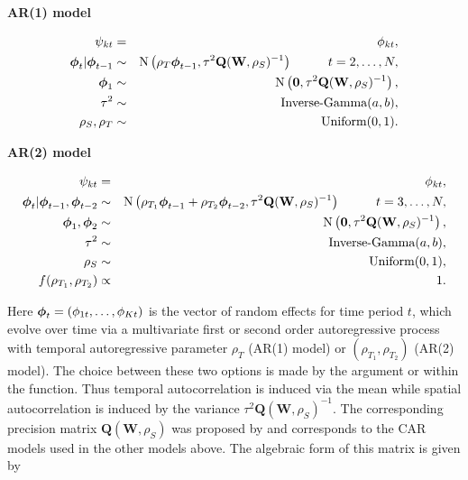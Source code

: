 \documentclass[article, nojss]{jss}
\newcommand{\bd}[1]{\ensuremath{\mbox{\boldmath $#1$}}}
\begin{document}
\textbf{AR(1) model}


\begin{eqnarray}
\psi_{kt}&=&\phi_{kt},\label{carar}\\
\bd{\phi}_t|\bd{\phi}_{t-1} & \sim & \mbox{N}\left(\rho_T\bd{\phi}_{t-1}, \tau^{2} \mathbf{Q}(\mathbf{W},\rho_S)^{-1}\right)\hspace{1cm} t=2,\ldots,N,\nonumber\\
\bd{\phi}_1 & \sim & \mbox{N}\left(\mathbf{0}, \tau^{2} \mathbf{Q}(\mathbf{W},\rho_S)^{-1}\right),\nonumber\\
\tau^2&\sim&\mbox{Inverse-Gamma}(a,b),\nonumber\\
\rho_S,\rho_T&\sim&\mbox{Uniform}(0,1).\nonumber
\end{eqnarray}


\textbf{AR(2) model}


\begin{eqnarray}
\psi_{kt}&=&\phi_{kt},\label{carar}\\
\bd{\phi}_t|\bd{\phi}_{t-1}, \bd{\phi}_{t-2} & \sim & \mbox{N}\left(\rho_{T_1}\bd{\phi}_{t-1}+\rho_{T_2}\bd{\phi}_{t-2}, \tau^{2} \mathbf{Q}(\mathbf{W},\rho_S)^{-1}\right)\hspace{1cm} t=3,\ldots,N,\nonumber\\
\bd{\phi}_1, \bd{\phi}_2 & \sim & \mbox{N}\left(\mathbf{0}, \tau^{2} \mathbf{Q}(\mathbf{W},\rho_S)^{-1}\right),\nonumber\\
\tau^2&\sim&\mbox{Inverse-Gamma}(a,b),\nonumber\\
\rho_S&\sim&\mbox{Uniform}(0,1),\nonumber\\
f(\rho_{T_1}, \rho_{T_2}) &\propto&1.\nonumber
\end{eqnarray}


Here $\bd{\phi}_{t}=(\phi_{1t},\ldots,\phi_{Kt})$ is the vector of random effects for time period $t$, which  evolve over time via a multivariate first or second order autoregressive process with temporal autoregressive parameter $\rho_T$ (AR(1) model) or $(\rho_{T_1}, \rho_{T_2})$ (AR(2) model). The choice between these two options is made by the argument   or  within the function. Thus temporal autocorrelation is induced via the mean  while spatial autocorrelation is induced by the variance $\tau^{2} \mathbf{Q}(\mathbf{W},\rho_S)^{-1}$. The corresponding precision matrix $\mathbf{Q}(\mathbf{W},\rho_S)$ was proposed by \cite{leroux2000} and corresponds to the CAR models used in the other models above. The algebraic form of this matrix is given by
\end{document}
